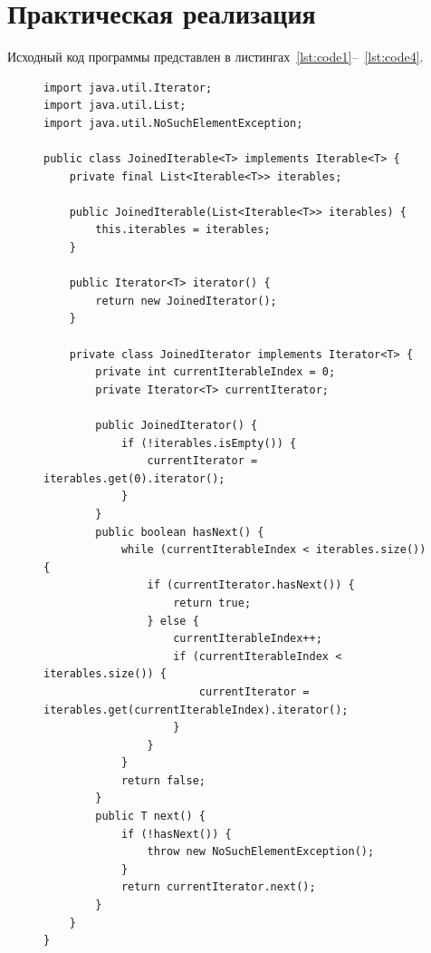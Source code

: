 \documentclass[a4paper, 14pt]{extarticle}
\begin{document}
\section {Практическая реализация}
Исходный код программы представлен в листингах~\ref{lst:code1}--~\ref{lst:code4}.
\begin{figure}[!htb]
\begin{lstlisting}[language={},caption={Основной класс для варинта 2 (IntSet)},label={lst:code1}]
import java.util.Iterator;
import java.util.List;
import java.util.NoSuchElementException;

public class JoinedIterable<T> implements Iterable<T> {
    private final List<Iterable<T>> iterables;

    public JoinedIterable(List<Iterable<T>> iterables) {
        this.iterables = iterables;
    }

    public Iterator<T> iterator() {
        return new JoinedIterator();
    }

    private class JoinedIterator implements Iterator<T> {
        private int currentIterableIndex = 0;
        private Iterator<T> currentIterator;

        public JoinedIterator() {
            if (!iterables.isEmpty()) {
                currentIterator = iterables.get(0).iterator();
            }
        }
        public boolean hasNext() {
            while (currentIterableIndex < iterables.size()) {
                if (currentIterator.hasNext()) {
                    return true;
                } else {
                    currentIterableIndex++;
                    if (currentIterableIndex < iterables.size()) {
                        currentIterator = iterables.get(currentIterableIndex).iterator();
                    }
                }
            }
            return false;
        }
        public T next() {
            if (!hasNext()) {
                throw new NoSuchElementException();
            }
            return currentIterator.next();
        }
    }
}


\end{lstlisting}
\end{figure}
\newpage
\end{document}
